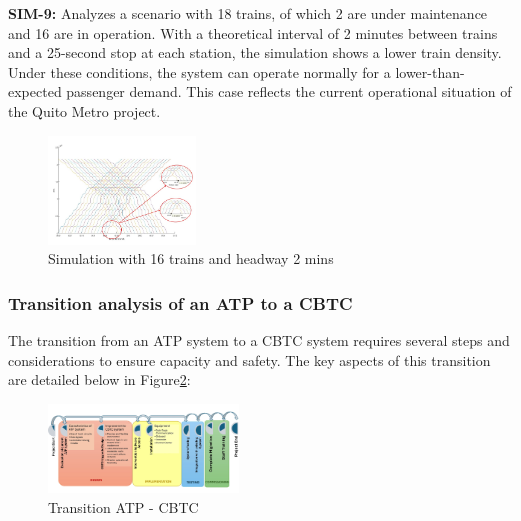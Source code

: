 \documentclass[conference]{IEEEtran}
\begin{document}
\textbf{SIM-9:}
Analyzes a scenario with 18 trains, of which 2 are under maintenance and 16 are in operation\cite{b20}. With a theoretical interval of 2 minutes between trains \cite{b18} and a 25-second stop at each station\cite{b15}, the simulation shows a lower train density. Under these conditions, the system can operate normally for a lower-than-expected passenger demand. This case reflects the current operational situation of the Quito Metro project\cite{b20}.
\begin{figure}[htbp]
    \centering
\includegraphics[width=0.35\textwidth,scale=1]{Imagenes_general/SIM-9_TIME-25_HW-2_TRAINS-16.jpg}
    \caption{Simulation with 16 trains and headway 2 mins}
    \label{fig:Simulation 9: 16 Trains / 2 mins headway}
\end{figure}

\subsubsection{Transition analysis of an ATP to a CBTC}
The transition from an ATP system to a CBTC system requires several steps and considerations to ensure capacity and safety. The key aspects of this transition are detailed below in Figure\ref{fig:Transition ATP - CBTC}:
\begin{figure}[htbp]
    \centering
\includegraphics[width=0.45\textwidth,scale=1]{Imagenes_general/PROCESOS_TRANSITION.jpg}
    \caption{Transition ATP - CBTC}
    \label{fig:Transition ATP - CBTC}
\end{figure}
\end{document}
